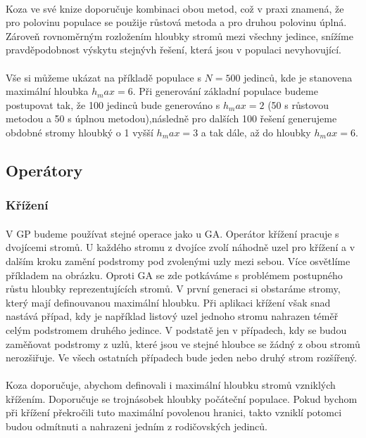 \documentclass[bc,male,java,dept460]{diploma}		%
\begin{document}
\paragraph*{}
Koza ve své knize \cite{kozagp} doporučuje kombinaci obou metod, což v praxi znamená, že pro polovinu populace se použije růstová metoda a pro druhou polovinu úplná. Zároveň rovnoměrným rozložením hloubky stromů mezi všechny jedince, snížíme pravděpodobnost výskytu stejnývh řešení, která jsou v populaci nevyhovující. 

\paragraph*{}
Vše si můžeme ukázat na příkladě populace s $N=500$ jedinců, kde je stanovena maximální hloubka $h_max=6$. Při generování základní populace budeme postupovat tak, že 100 jedinců bude generováno s $h_max=2$ (50 s růstovou metodou a 50 s úplnou metodou),následně pro dalších 100 řešení generujeme obdobné stromy hloubký o 1 vyšší $h_max=3$ a tak dále, až do hloubky $h_max=6$.

\subsection{Operátory}

\subsubsection{Křížení}
\paragraph*{}
V GP budeme používat stejné operace jako u GA. Operátor křížení pracuje s dvojícemi stromů. U každého stromu z dvojíce zvolí náhodně uzel pro křížení a v dalším kroku zamění podstromy pod zvolenými uzly mezi sebou. Více osvětlíme příkladem na obrázku. Oproti GA se zde potkáváme s problémem postupného růstu hloubky reprezentujících stromů. V první generaci si obstaráme stromy, který mají definouvanou maximální hloubku. Při aplikaci křížení však snad nastává případ, kdy je například listový uzel jednoho stromu nahrazen téměř celým podstromem druhého jedince. V podstatě jen v případech, kdy se budou zaměňovat podstromy z uzlů, které jsou ve stejné hloubce se žádný z obou stromů nerozšiřuje. Ve všech ostatních případech bude jeden nebo druhý strom rozšířený.

\paragraph*{}
Koza doporučuje, abychom definovali i maximální hloubku stromů vzniklých křížením. Doporučuje se trojnásobek hloubky počáteční populace. Pokud bychom při křížení překročili tuto maximální povolenou hranici, takto vzniklí potomci budou odmítnuti a nahrazeni jedním z rodičovských jedinců.
\end{document}
